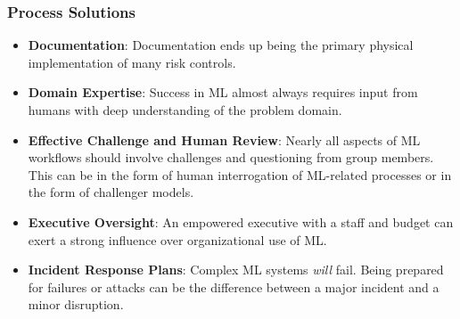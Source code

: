 \documentclass[11pt,
               aspectratio=169,
               hyperref={colorlinks}
               ]{beamer}
\begin{document}
		\begin{frame}
		
			\frametitle{Process Solutions}
			
			\begin{itemize}

				\item \textbf{Documentation}: Documentation ends up being the primary physical implementation of many risk controls. 

				\item \textbf{Domain Expertise}: Success in ML almost always requires input from humans with deep understanding of the problem domain. 
				
				\item \textbf{Effective Challenge and Human Review}: Nearly all aspects of ML workflows should involve challenges and questioning from group members. This can be in the form of human interrogation of ML-related processes or in the form of challenger models. 
				
				\item \textbf{Executive Oversight}: An empowered executive with a staff and budget can exert a strong influence over organizational use of ML.
				
				\item \textbf{Incident Response Plans}: Complex ML systems \textit{will} fail. Being prepared for failures or attacks can be the difference between a major incident and a minor disruption.
				
			\end{itemize}
			
		\end{frame}
		
\end{document}
